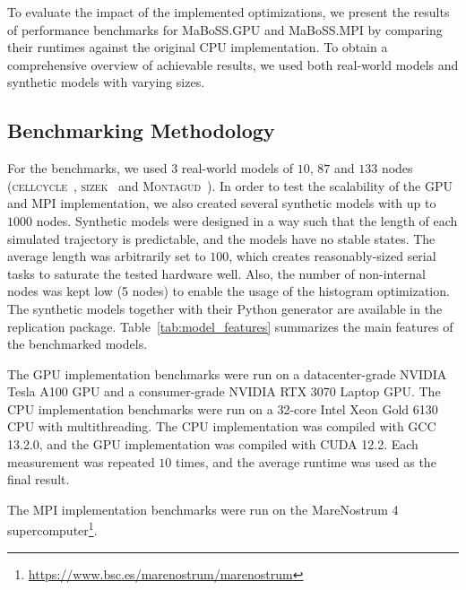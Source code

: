 \documentclass[sn-mathphys-num]{sn-jnl}%
\begin{document}
To evaluate the impact of the implemented optimizations, we present the results of performance benchmarks for MaBoSS.GPU and MaBoSS.MPI by comparing their runtimes against the original CPU implementation. To obtain a comprehensive overview of achievable results, we used both real-world models and synthetic models with varying sizes.

\subsection{Benchmarking Methodology}

For the benchmarks, we used $3$ real-world models of $10$, $87$ and $133$ nodes (\textsc{cellcycle}~\cite{faure2006cellcycle}, \textsc{sizek}~\cite{sizek2019boolean} and \textsc{Montagud}~\cite{montagud2022prostate}). In order to test the scalability of the GPU and MPI implementation, we also created several synthetic models with up to $1000$ nodes. Synthetic models were designed in a way such that the length of each simulated trajectory is predictable, and the models have no stable states. The average length was arbitrarily set to $100$, which creates reasonably-sized serial tasks to saturate the tested hardware well. Also, the number of non-internal nodes was kept low (5 nodes) to enable the usage of the histogram optimization. The synthetic models together with their Python generator are available in the replication package. Table~\ref{tab:model_features} summarizes the main features of the benchmarked models.

The GPU implementation benchmarks were run on a datacenter-grade NVIDIA Tesla A100 GPU and a consumer-grade NVIDIA RTX 3070 Laptop GPU. The CPU implementation benchmarks were run on a 32-core Intel Xeon Gold 6130 CPU with multithreading. The CPU implementation was compiled with GCC 13.2.0, and the GPU implementation was compiled with CUDA 12.2. Each measurement was repeated $10$ times, and the average runtime was used as the final result.

The MPI implementation benchmarks were run on the MareNostrum 4 supercomputer\footnote{\url{https://www.bsc.es/marenostrum/marenostrum}}.
\end{document}
